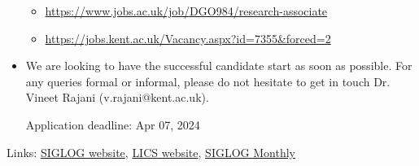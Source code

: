 \documentclass[prodmode,acmtecs]{acmsmall} %
\begin{document}
\begin{itemize}
\begin{itemize}\item  \href{https://www.jobs.ac.uk/job/DGO984/research-associate}{https://www.jobs.ac.uk/job/DGO984/research-associate}
\item  \href{https://jobs.kent.ac.uk/Vacancy.aspx?id=7355\&forced=2}{https://jobs.kent.ac.uk/Vacancy.aspx?id=7355\&forced=2}
\end{itemize} 
\item  We are looking to have the successful candidate start as soon as possible. For any queries formal or informal, please do not hesitate to get in touch Dr. Vineet Rajani (v.rajani@kent.ac.uk). 
 
Application deadline: Apr 07, 2024 
 
\end{itemize}


\bigskip Links: \href{http://siglog.org/}{SIGLOG website}, \href{https://lics.siglog.org}{LICS website}, \href{https://lics.siglog.org/newsletters/}{SIGLOG Monthly}
\end{document}
